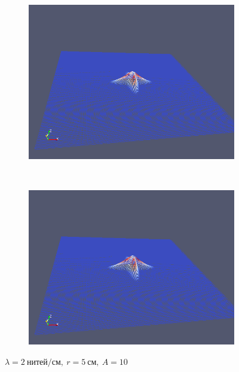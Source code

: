 \begin{figure}[H]
\begin{subfigure}[t]{0.5\textwidth}
        \includegraphics[width=\textwidth]{img/fiber/density_2_radius_5_amplitude_10/5.png}
    \end{subfigure}%
    ~
    \begin{subfigure}[t]{0.5\textwidth}
        \centering
        \includegraphics[width=\textwidth]{img/fiber/density_2_radius_5_amplitude_10/6.png}
    \end{subfigure}
    \caption{$\lambda=2~нитей/см,~r=5~см,~A=10$}
\end{figure}
